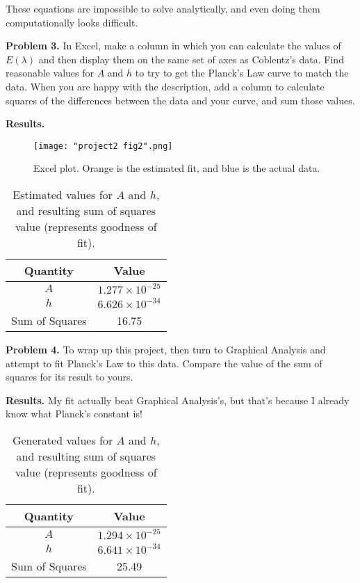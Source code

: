 \documentclass{article}
\begin{document}
These equations are impossible to solve analytically, and even doing them computationally looks difficult.

\textbf{Problem 3.} In Excel, make a column in which you can calculate the values of $E(\lambda)$ and then display them on the same set of axes as Coblentz's data. Find reasonable values for $A$ and $h$ to try to get the Planck's Law curve to match the data. When you are happy with the description, add a column to calculate squares of the differences between the data and your curve, and sum those values.

\textbf{Results.} 
\begin{figure}[H]
\centering
\texttt{[image: "project2 fig2".png]}
\caption{Excel plot. Orange is the estimated fit, and blue is the actual data.}
\end{figure}

\begin{table}[H]
	\centering
	\begin{tabular}{cc}
		\toprule
		Quantity & Value \\
		\midrule
		$A$ & $1.277\times 10^{-25}$ \\
		$h$ & $6.626\times 10^{-34}$ \\
		Sum of Squares & 16.75 \\
		\bottomrule
	\end{tabular}
	\caption{Estimated values for $A$ and $h$, and resulting sum of squares value (represents goodness of fit).}
\end{table}

\textbf{Problem 4.} To wrap up this project, then turn to Graphical Analysis and attempt to fit Planck's Law to this data. Compare the value of the sum of squares for its result to yours.

\textbf{Results.} My fit actually beat Graphical Analysis's, but that's because I already know what Planck's constant is!

\begin{table}[H]
	\centering
	\begin{tabular}{cc}
		\toprule
		Quantity & Value \\
		\midrule
		$A$ & $1.294\times 10^{-25}$ \\
		$h$ & $6.641\times 10^{-34}$ \\
		Sum of Squares & 25.49 \\
		\bottomrule
	\end{tabular}
	\caption{Generated values for $A$ and $h$, and resulting sum of squares value (represents goodness of fit).}
\end{table}
\end{document}
